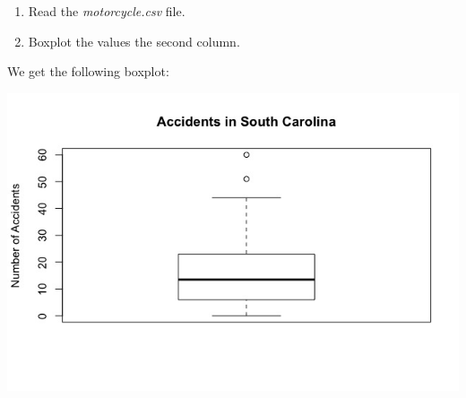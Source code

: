 \documentclass[12pt,letterpaper,titlepage,en-US]{article}
\begin{document}
\begin{enumerate}
\item Read the \emph{motorcycle.csv} file.

\item Boxplot the values the second column.
\end{enumerate}

We get the following boxplot:
\begin{center}
\includegraphics[scale=0.6]{2.jpeg}
\end{center}
\end{document}
